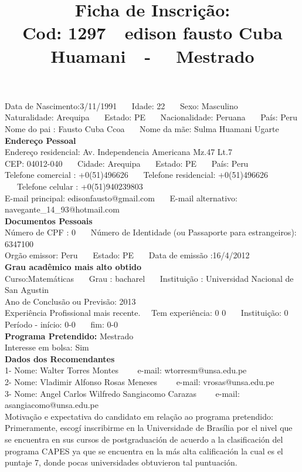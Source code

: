 \documentclass[11pt]{article}
\title{\vspace*{-4cm} Ficha de Inscrição: \\Cod: 1297\ \ edison fausto  Cuba Huamani\ \ - \ \ Mestrado 
 }
\date{}
\begin{document}
\maketitle
\vspace*{-1.5cm}
\noindent Data de Nascimento:3/11/1991
\ \ \ Idade: 22   \ \ \ Sexo: Masculino
\\
Naturalidade: Arequipa  
\ \ \  Estado: PE
\ \ \  Nacionalidade: Peruana
\ \ \ País: Peru
\\        
Nome do pai : Fausto Cuba Ccoa
\ \ \ Nome da mãe: Sulma Huamani Ugarte          
\\[0.2cm]                     
\textbf{Endereço Pessoal} 
\\ 
\noindent Endereço residencial: Av. Independencia Americana Mz.47 Lt.7
\\
        CEP: 04012-040 
\ \ \ Cidade: Arequipa 
\ \ \ Estado: PE 
\ \ \ País: Peru
\\		
		Telefone comercial : +0(51)496626
\ \ \ Telefone residencial: +0(51)496626
\ \ \ Telefone celular : +0(51)940239803
\\
E-mail principal: edisonfausto@gmail.com
\ \ \ E-mail alternativo: navegante\_14\_93@hotmail.com 
\\[0.2cm] 
\textbf{Documentos Pessoais}
\\
\noindent Número de CPF : 0
\ \ \ Número de Identidade (ou Passaporte para estrangeiros): 6347100
\\
Orgão emissor: Peru
\ \ \ Estado: PE
\ \ \ Data de emissão :16/4/2012
\\[0.3cm]
\textbf{Grau acadêmico mais alto obtido}
\\	
Curso:Matemáticas
\ \ \ Grau : bacharel
\ \ \ Instituição : Universidad Nacional de San Agustin
\\			
Ano de Conclusão ou Previsão: 2013
\\ 
Experiência Profissional mais recente. \ \  
Tem experiência: 0 0  
\ \ \ Instituição: 0
\\  
Período - início: 0-0
\ \ \ fim: 0-0
\\[0.2cm] 
\textbf{Programa Pretendido:} Mestrado\\
Interesse em bolsa: Sim
\\[0.3cm]		
\textbf{Dados dos Recomendantes} 
\\
1- Nome: Walter Torres Montes
\ \ \ \  e-mail: wtorresm@unsa.edu.pe 
\\
2- Nome: Vladimir Alfonso Rosas Meneses
\ \ \ \ e-mail: vrosas@unsa.edu.pe
\\
3- Nome: Angel Carlos Wilfredo Sangiacomo Carazas
\ \ \ \ e-mail: asangiacomo@unsa.edu.pe
\\[0.2cm]
Motivação e expectativa do candidato em relação ao programa pretendido:
\\Primeramente, escogí inscribirme en la Universidade de Brasília por el nivel que se encuentra en sus cursos de postgraduación de acuerdo a la clasificación del programa CAPES ya que se encuentra en la más alta calificación la cual es el puntaje 7, donde pocas universidades obtuvieron tal puntuación.
\end{document}

